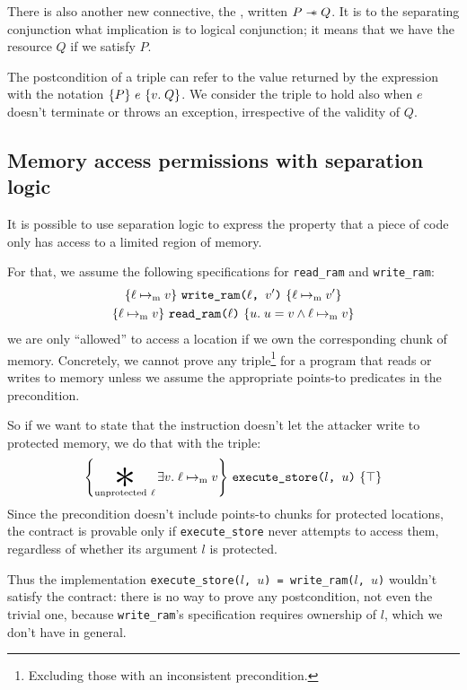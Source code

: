 There is also another new connective, the , written \(P \mathrel{-\!\!\ast} Q\). It is to the separating conjunction what implication is to logical conjunction; it means that we have the resource \(Q\) if we satisfy \(P\).

The postcondition of a triple can refer to the value returned by the expression with the notation \(\hoare{P}{e}[v]{Q}\). We consider the triple to hold also when \(e\) doesn't terminate or throws an exception, irrespective of the validity of \(Q\).

\subsection{Memory access permissions with separation logic}
\label{sec:sep-logic-permissions}

It is possible to use separation logic to express the property that a piece of code only has access to a limited region of memory.

For that, we assume the following specifications for \texttt{read\_ram} and \texttt{write\_ram}:
\begin{gather*}
  \hoare{\ell \ptom v}{\texttt{write\_ram($\ell$, $v'$)}}{\ell \ptom v'} \\
  \hoare{\ell \ptom v}{\texttt{read\_ram($\ell$)}}[u]{u = v \wedge \ell \ptom v}
\end{gather*}
we are only ``allowed'' to access a location if we own the corresponding chunk of memory. Concretely, we cannot prove any triple\footnote{Excluding those with an inconsistent precondition.} for a program that reads or writes to memory unless we assume the appropriate points-to predicates in the precondition.

So if we want to state that the  instruction doesn't let the attacker write to protected memory, we do that with the triple:
\[ \hoare{\bigast_{\smash{\mathrm{unprotected}~\ell}} \exists v.\; \ell \ptom v}{\texttt{execute\_store($l$, $u$)}}{\top}\]
Since the precondition doesn't include points-to chunks for protected locations, the contract is provable only if \texttt{execute\_store} never attempts to access them, regardless of whether its argument \(l\) is protected.

Thus the implementation \texttt{execute\_store(\(l\), \(u\)) = write\_ram(\(l\), \(u\))} wouldn't satisfy the contract: there is no way to prove any postcondition, not even the trivial one, because \texttt{write\_ram}'s specification requires ownership of \(l\), which we don't have in general.

